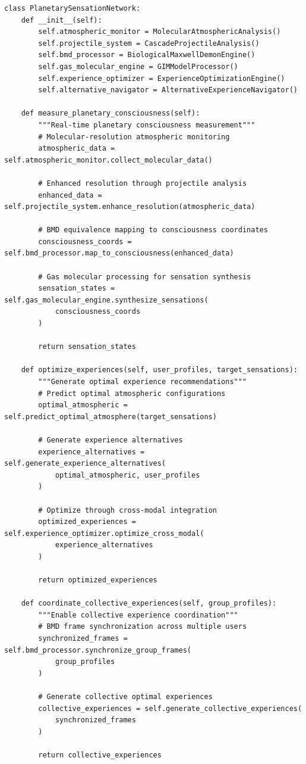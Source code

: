 \documentclass[12pt,a4paper]{article}
\begin{document}
\begin{lstlisting}[style=pythonstyle, caption=Core System Architecture]
class PlanetarySensationNetwork:
    def __init__(self):
        self.atmospheric_monitor = MolecularAtmosphericAnalysis()
        self.projectile_system = CascadeProjectileAnalysis()
        self.bmd_processor = BiologicalMaxwellDemonEngine()
        self.gas_molecular_engine = GIMModelProcessor()
        self.experience_optimizer = ExperienceOptimizationEngine()
        self.alternative_navigator = AlternativeExperienceNavigator()
        
    def measure_planetary_consciousness(self):
        """Real-time planetary consciousness measurement"""
        # Molecular-resolution atmospheric monitoring
        atmospheric_data = self.atmospheric_monitor.collect_molecular_data()
        
        # Enhanced resolution through projectile analysis
        enhanced_data = self.projectile_system.enhance_resolution(atmospheric_data)
        
        # BMD equivalence mapping to consciousness coordinates
        consciousness_coords = self.bmd_processor.map_to_consciousness(enhanced_data)
        
        # Gas molecular processing for sensation synthesis
        sensation_states = self.gas_molecular_engine.synthesize_sensations(
            consciousness_coords
        )
        
        return sensation_states
    
    def optimize_experiences(self, user_profiles, target_sensations):
        """Generate optimal experience recommendations"""
        # Predict optimal atmospheric configurations
        optimal_atmospheric = self.predict_optimal_atmosphere(target_sensations)
        
        # Generate experience alternatives
        experience_alternatives = self.generate_experience_alternatives(
            optimal_atmospheric, user_profiles
        )
        
        # Optimize through cross-modal integration
        optimized_experiences = self.experience_optimizer.optimize_cross_modal(
            experience_alternatives
        )
        
        return optimized_experiences
    
    def coordinate_collective_experiences(self, group_profiles):
        """Enable collective experience coordination"""
        # BMD frame synchronization across multiple users
        synchronized_frames = self.bmd_processor.synchronize_group_frames(
            group_profiles
        )
        
        # Generate collective optimal experiences
        collective_experiences = self.generate_collective_experiences(
            synchronized_frames
        )
        
        return collective_experiences
\end{lstlisting}
\end{document}
